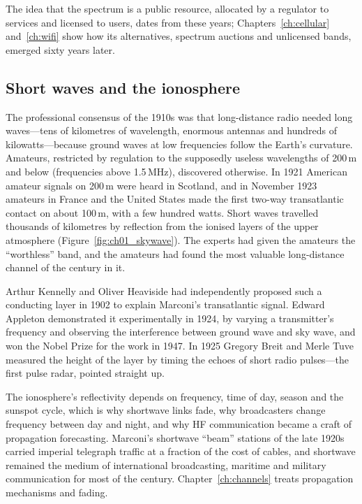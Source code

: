 The idea that the spectrum is a public resource, allocated by a regulator to services and licensed to
users, dates from these years; Chapters~\ref{ch:cellular} and~\ref{ch:wifi} show how its alternatives,
spectrum auctions and unlicensed bands, emerged sixty years later.

\subsection{Short waves and the ionosphere}
\label{sec:ch01:shortwave}

The professional consensus of the 1910s was that long-distance radio needed long waves---tens of
kilometres of wavelength, enormous antennas and hundreds of kilowatts---because ground waves at low
frequencies follow the Earth's curvature. Amateurs, restricted by regulation to the supposedly useless
wavelengths of 200\,m and below (frequencies above 1.5\,MHz), discovered otherwise. In 1921 American
amateur signals on 200\,m were heard in Scotland, and in November 1923 amateurs in France and the United
States made the first two-way transatlantic contact on about 100\,m, with a few hundred watts. Short
waves travelled thousands of kilometres by reflection from the ionised layers of the upper atmosphere
(Figure~\ref{fig:ch01_skywave}). The experts had given the amateurs the ``worthless'' band, and the
amateurs had found the most valuable long-distance channel of the century in it.


Arthur Kennelly and Oliver Heaviside had independently proposed such a conducting layer in 1902 to
explain Marconi's transatlantic signal. Edward Appleton demonstrated it experimentally in 1924, by
varying a transmitter's frequency and observing the interference between ground wave and sky wave,
and won the Nobel Prize for the work in 1947. In 1925 Gregory Breit and Merle Tuve measured the
height of the layer by timing the echoes of short radio pulses---the first pulse radar, pointed
straight up.

The ionosphere's reflectivity depends on frequency, time of day, season and the sunspot cycle, which
is why shortwave links fade, why broadcasters change frequency between day and night, and why HF
communication became a craft of propagation forecasting. Marconi's shortwave ``beam'' stations of the
late 1920s carried imperial telegraph traffic at a fraction of the cost of cables, and shortwave
remained the medium of international broadcasting, maritime and military communication for most of the
century. Chapter~\ref{ch:channels} treats propagation mechanisms and fading.

